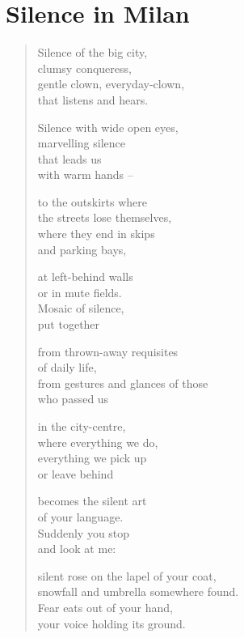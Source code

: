 \clearpage

\section{Silence in Milan}


\begin{verse}

Silence of the big city,\\
clumsy conqueress,\\
gentle clown, everyday-clown,\\
that listens and hears.

Silence with wide open eyes,\\
marvelling silence\\
that leads us\\
with warm hands --

to the outskirts where\\
the streets lose themselves,\\
where they end in skips\\
and parking bays,

at left-behind walls\\
or in mute fields.\\
Mosaic of silence,\\
put together

from thrown-away requisites\\
of daily life,\\
from gestures and glances of those\\
who passed us

\clearpage

in the city-centre,\\
where everything we do,\\
everything we pick up\\
or leave behind

becomes the silent art\\
of your language.\\
Suddenly you stop\\
and look at me:

silent rose on the lapel of your coat,\\
snowfall and umbrella somewhere found.\\
Fear eats out of your hand,\\
your voice holding its ground.

\end{verse}

